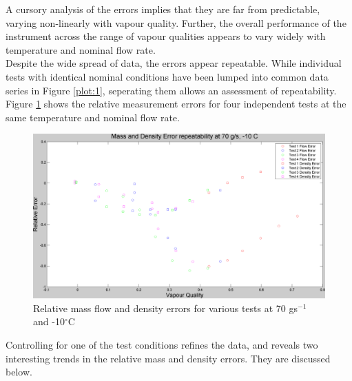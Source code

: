 \documentclass{report}
\begin{document}
\FloatBarrier
A cursory analysis of the errors implies that they are far from predictable, varying non-linearly with vapour quality. Further, the overall performance of the instrument across the range of vapour qualities appears to vary widely with temperature and nominal flow rate.\\
Despite the wide spread of data, the errors appear repeatable. While individual tests with identical nominal conditions have been lumped into common data series in Figure \ref{plot:1}, seperating them allows an assessment of repeatability. Figure \ref{plot:11} shows the relative measurement errors for four independent tests at the same temperature and nominal flow rate. 
\FloatBarrier
\begin{figure}[h]
\includegraphics[width=\textwidth]{plots/fig11}
\caption{Relative mass flow and density errors for various tests at 70 gs$^{-1}$ and -10$^\circ$C}
\label{plot:11}
\end{figure}
\FloatBarrier
Controlling for one of the test conditions refines the data, and reveals two interesting trends in the relative mass and density errors. They are discussed below.
\FloatBarrier
\end{document}
